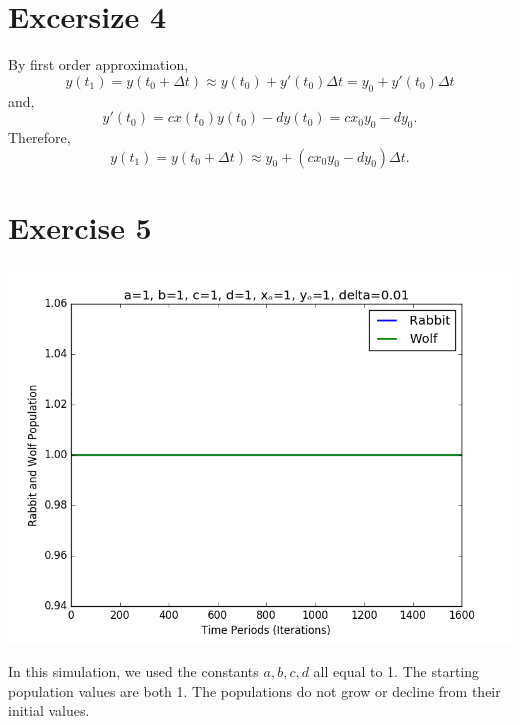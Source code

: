 \documentclass{article}
\begin{document}
\newpage
\section{Excersize 4}
By first order approximation,
\begin{equation*}
  y(t_1) = y(t_0 + \Delta t) \approx y(t_0) + y'(t_0)\Delta t = y_0+y'(t_0)\Delta t
\end{equation*}
and,
\begin{equation*}
  y'(t_0) = cx(t_0)y(t_0) - dy(t_0) = cx_0y_0 -dy_0.
\end{equation*}
Therefore,
\begin{equation*}
  y(t_1) = y(t_0 + \Delta t) \approx y_0 + (cx_0y_0 - dy_0)\Delta t.
\end{equation*}

\section{Exercise 5}
\centerline{\includegraphics[scale=0.5]{exercise5/figure_1.png}}
In this simulation, we used the constants $a, b, c, d$ all equal to 1.
The starting population values are both 1.
The populations do not grow or decline from their initial values.\\
\end{document}

